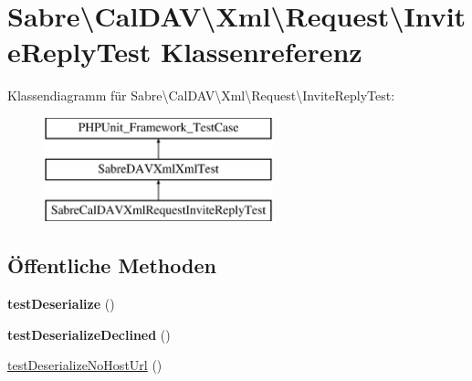 \hypertarget{class_sabre_1_1_cal_d_a_v_1_1_xml_1_1_request_1_1_invite_reply_test}{}\section{Sabre\textbackslash{}Cal\+D\+AV\textbackslash{}Xml\textbackslash{}Request\textbackslash{}Invite\+Reply\+Test Klassenreferenz}
\label{class_sabre_1_1_cal_d_a_v_1_1_xml_1_1_request_1_1_invite_reply_test}
Klassendiagramm für Sabre\textbackslash{}Cal\+D\+AV\textbackslash{}Xml\textbackslash{}Request\textbackslash{}Invite\+Reply\+Test\+:\begin{figure}[H]
\begin{center}
\leavevmode
\includegraphics[height=3.000000cm]{class_sabre_1_1_cal_d_a_v_1_1_xml_1_1_request_1_1_invite_reply_test}
\end{center}
\end{figure}
\subsection*{Öffentliche Methoden}
\begin{DoxyCompactItemize}
\item 
\mbox{\label{class_sabre_1_1_cal_d_a_v_1_1_xml_1_1_request_1_1_invite_reply_test_a76c5d26fde8d662322881ac4d435d346}} 
{\bfseries test\+Deserialize} ()
\item 
\mbox{\label{class_sabre_1_1_cal_d_a_v_1_1_xml_1_1_request_1_1_invite_reply_test_a06e2f765235da749e46488c582b21203}} 
{\bfseries test\+Deserialize\+Declined} ()
\item 
\mbox{\hyperlink{class_sabre_1_1_cal_d_a_v_1_1_xml_1_1_request_1_1_invite_reply_test_a1aeb43308bd7125f10949121fcb04166}{test\+Deserialize\+No\+Host\+Url}} ()
\end{DoxyCompactItemize}
